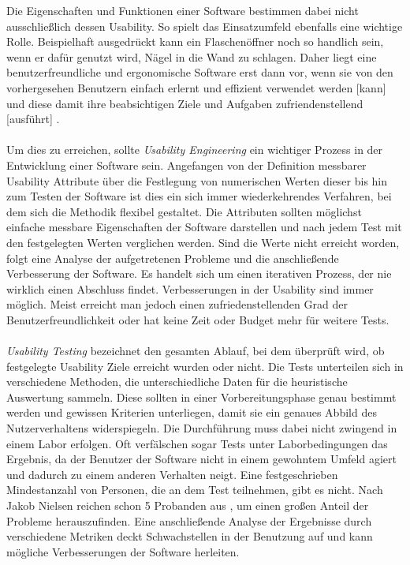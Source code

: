 Die Eigenschaften und Funktionen einer Software bestimmen dabei nicht ausschließlich dessen Usability. So spielt das Einsatzumfeld ebenfalls eine wichtige Rolle. Beispielhaft ausgedrückt kann ein Flaschenöffner noch so handlich sein, wenn er dafür genutzt wird, Nägel in die Wand zu schlagen. Daher liegt eine benutzerfreundliche und ergonomische Software erst dann vor, wenn \glqq sie von den vorhergesehen Benutzern einfach erlernt und effizient verwendet werden [kann] und diese damit ihre beabsichtigen Ziele und Aufgaben zufriendenstellend [ausführt]\grqq{} \cite{UsabilityKompakt}.\\
\\
Um dies zu erreichen, sollte \textit{Usability Engineering} ein wichtiger Prozess in der Entwicklung einer Software sein. Angefangen von der Definition messbarer Usability Attribute über die Festlegung von numerischen Werten dieser bis hin zum Testen der Software ist dies ein sich immer wiederkehrendes Verfahren, bei dem sich die Methodik flexibel gestaltet. Die Attributen sollten möglichst einfache messbare Eigenschaften der Software darstellen und nach jedem Test mit den festgelegten Werten verglichen werden. Sind die Werte nicht erreicht worden, folgt eine Analyse der aufgetretenen Probleme und die anschließende Verbesserung der Software. Es handelt sich um einen iterativen Prozess, der nie wirklich einen Abschluss findet. Verbesserungen in der Usability sind immer möglich. Meist erreicht man jedoch einen zufriedenstellenden Grad der Benutzerfreundlichkeit oder hat keine Zeit oder Budget mehr für weitere Tests.\\
\\
\textit{Usability Testing} bezeichnet den gesamten Ablauf, bei dem überprüft wird, ob festgelegte Usability Ziele erreicht wurden oder nicht. Die Tests unterteilen sich in verschiedene Methoden, die unterschiedliche Daten für die heuristische Auswertung sammeln. Diese sollten in einer Vorbereitungsphase genau bestimmt werden und gewissen Kriterien unterliegen, damit sie ein genaues Abbild des Nutzerverhaltens widerspiegeln. Die Durchführung muss dabei nicht zwingend in einem Labor erfolgen. Oft verfälschen sogar Tests unter Laborbedingungen das Ergebnis, da der Benutzer der Software nicht in einem gewohntem Umfeld agiert und dadurch zu einem anderen Verhalten neigt. Eine festgeschrieben Mindestanzahl von Personen, die an dem Test teilnehmen, gibt es nicht. Nach Jakob Nielsen reichen schon 5 Probanden aus \cite{anzahlTestpersonen}, um einen großen Anteil der Probleme herauszufinden. Eine anschließende Analyse der Ergebnisse durch verschiedene Metriken deckt Schwachstellen in der Benutzung auf und kann mögliche Verbesserungen der Software herleiten.\\

